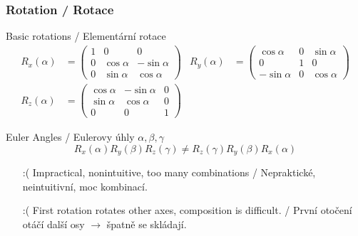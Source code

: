 \begin{frame}\frametitle{Rotation / Rotace}
  Basic rotations / Elementární rotace 
  \begin{align*}
    R_x(\alpha) &= \begin{pmatrix}
            1 & 0 & 0 \\
            0 & \cos \alpha & -\sin \alpha \\
            0 & \sin \alpha & \cos \alpha
        \end{pmatrix} &
    R_y(\alpha) &= \begin{pmatrix}
            \cos \alpha & 0 & \sin \alpha \\
            0 & 1 & 0 \\
            -\sin \alpha & 0 & \cos \alpha
        \end{pmatrix} \\
    R_z(\alpha) &= \begin{pmatrix}
            \cos \alpha & -\sin \alpha & 0 \\
            \sin \alpha & \cos \alpha & 0 \\
            0 & 0 & 1
        \end{pmatrix}
  \end{align*}

  \vfill

  Euler Angles / Eulerovy úhly $\alpha, \beta, \gamma$
  \begin{equation*}
      R_x(\alpha)R_y(\beta)R_z(\gamma) \ne R_z(\gamma)R_y(\beta)R_x(\alpha)
  \end{equation*}
  \begin{itemize}
      \item[\color{red}:(] Impractical, nonintuitive, too many combinations / Nepraktické, neintuitivní, moc kombinací.
      \item[\color{red}:(] First rotation rotates other axes, composition is difficult. / První otočení otáčí další osy $\rightarrow$ špatně se skládají.
  \end{itemize}
\end{frame}

